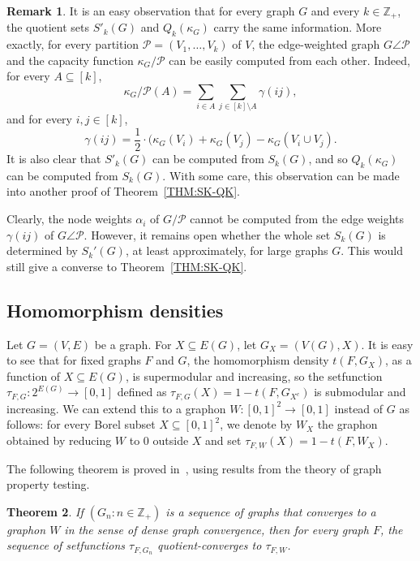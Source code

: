 \documentclass[10pt]{article}
\theoremstyle{plain}
\newtheorem{thm}{Theorem}[section]
\theoremstyle{definition}
\newtheorem{rem}[thm]{Remark}
\newcommand{\PER}{\angle}
\newcommand{\bbZ}{\mathbb{Z}}
\newcommand{\PP}{\mathcal{P}}
\begin{document}
\begin{rem}
It is an easy observation that for every graph $G$ and every $k\in\bbZ_+$, the
quotient sets $S'_k(G)$ and $Q_k(\kappa_G)$ carry the same information. More
exactly, for every partition $\PP=(V_1,\dots,V_k)$ of $V$, the edge-weighted graph $G\PER\PP$ and the capacity function
$\kappa_G/\PP$ can be easily computed from each other. Indeed, for every $A\subseteq [k]$,
\begin{equation}\label{EQ:EDGE2CUT}
\kappa_G/\PP(A)=\sum_{i\in A}\sum_{j\in [k]\setminus A} \gamma(ij),
\end{equation}
and for every $i,j\in[k]$,
\begin{equation}\label{EQ:EDGE2CUT2}
\gamma(ij)=\frac12\cdot (\kappa_G(V_i)+\kappa_G(V_j)-\kappa_G(V_i\cup V_j).
\end{equation}
It is also clear that $S'_k(G)$ can be computed from $S_k(G)$, and so
$Q_k(\kappa_G)$ can be computed from $S_k(G)$. With some care, this observation
can be made into another proof of Theorem~\ref{THM:SK-QK}.

Clearly, the node weights
$\alpha_i$ of $G/\PP$ cannot be computed from the edge weights $\gamma(ij)$ of
$G\PER\PP$. However, it remains open whether the whole set $S_k(G)$ is determined by $S_k'(G)$, at
least approximately, for large graphs $G$. This would still give a converse to
Theorem~\ref{THM:SK-QK}.
\end{rem}

\subsection{Homomorphism densities}\label{SSEC:HOMO-DENSITY}
\label{sec:hom}

Let $G=(V,E)$ be a graph. For $X\subseteq E(G)$, let $G_X=(V(G),X)$. It is easy to see that for fixed graphs $F$ and $G$, the homomorphism density $t(F,G_X)$, as a function of $X\subseteq E(G)$, is supermodular and increasing, so the setfunction $\tau_{F,G}\colon 2^{E(G)}\to[0,1]$ defined as $\tau_{F,G}(X)=1-t(F,G_{X^c})$ is submodular and increasing. We can extend this to a graphon $W\colon [0,1]^2\to[0,1]$ instead of $G$ as follows: for every Borel subset $X\subseteq [0,1]^2$, we denote by $W_X$ the graphon obtained by reducing $W$ to $0$ outside $X$ and set $\tau_{F,W}(X)=1-t(F,W_X)$. 

The following theorem is proved in~\cite{BBLTconv}, using results from the theory of graph property testing.

\begin{thm}\label{THM:DENSE-CONV-QUOTIENT}
If $(G_n\colon  n\in\bbZ_+)$ is a sequence of graphs that converges to a graphon $W$ in the sense of dense graph convergence, then for every graph $F$, the sequence of setfunctions $\tau_{F,G_n}$ quotient-converges to $\tau_{F,W}$. 
\end{thm}    
\end{document}

